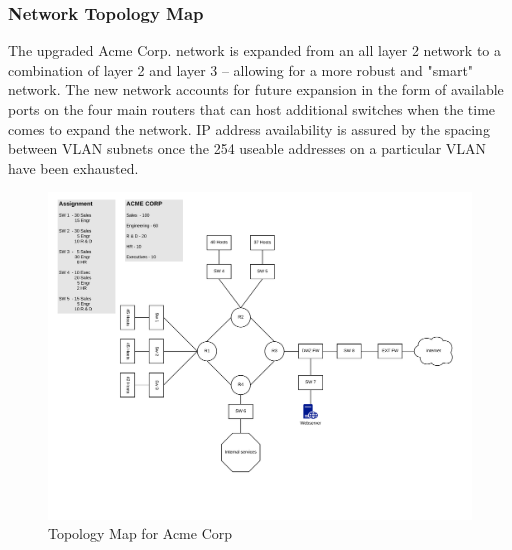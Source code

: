 \subsubsection{Network Topology Map}
The upgraded Acme Corp. network is expanded from an all layer 2 network to a 
combination of layer 2 and layer 3 -- allowing for a more robust and "smart" 
network. The new network accounts for future expansion in the form of 
available ports on the four main routers that can host additional switches when
the time comes to expand the network. IP address availability is assured by
the spacing between VLAN subnets once the 254 useable addresses on a particular 
VLAN have been exhausted.
 
\begin{figure}[!htb]
	\includegraphics[width=\textwidth]{images/networktopology.png}
	\caption{Topology Map for Acme Corp}
\end{figure}
